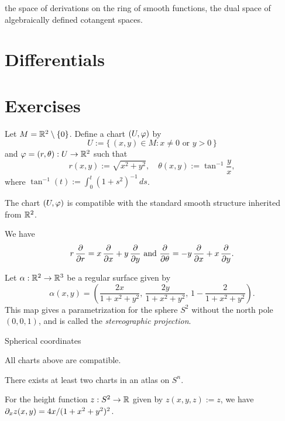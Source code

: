 \documentclass{../../large}
\renewcommand{\a}{\alpha}
\begin{document}
\begin{prb}
\end{prb}
\begin{prb}
\end{prb}
the space of derivations on the ring of smooth functions,
the dual space of algebraically defined cotangent spaces.












\section{Differentials}







\section*{Exercises}
\setcounter{prb}{0}
\begin{prb}
Let $M=\mathbb{R}^2\setminus\{0\}$.
Define a chart $(U,\varphi)$ by
\[U:=\{\,(x,y)\in M:x\ne0\text{ or }y>0\,\}\]
and $\varphi=(r,\theta):U\to\mathbb{R}^2$ such that
\[r(x,y):=\sqrt{x^2+y^2},\quad\theta(x,y):=\tan^{-1}\frac yx,\]
where $\tan^{-1}(t):=\int_0^t(1+s^2)^{-1}\,ds$.
\begin{parts}
\item The chart $(U,\varphi)$ is compatible with the standard smooth structure inherited from $\mathbb{R}^2$.
\item We have
\[r\,\pd{r}=x\,\pd{x}+y\,\pd{y}\text{ and }\pd{\theta}=-y\,\pd{x}+x\,\pd{y}.\]
\end{parts}
\end{prb}

\begin{prb}[Spheres]
Let $\a:\R^2\to\R^3$ be a regular surface given by
\[\a(x,y)=\left(\frac{2x}{1+x^2+y^2},\,\frac{2y}{1+x^2+y^2},\,1-\frac2{1+x^2+y^2}\right).\]
This map gives a parametrization for the sphere $S^2$ without the north pole $(0,0,1)$, and is called the \emph{stereographic projection}.

Spherical coordinates
\begin{parts}
\item All charts above are compatible.
\item There exists at least two charts in an atlas on $S^n$.
\item For the height function $z:S^2\to\mathbb{R}$ given by $z(x,y,z):=z$, we have $\pd_xz(x,y)=4x/(1+x^2+y^2)^2$.
\end{parts}
\end{prb}
\end{document}
